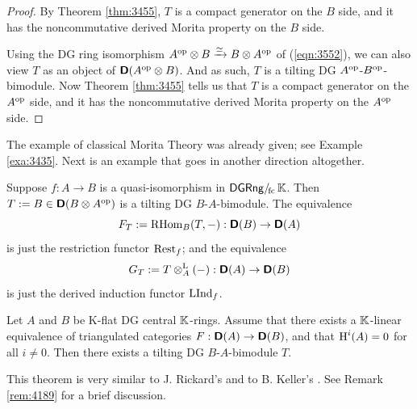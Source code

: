 \begin{proof}
By Theorem \ref{thm:3455}, $T$ is a compact generator on the $B$ side, 
and it has the noncommutative derived Morita property on the $B$ side. 

Using the DG ring isomorphism 
$A^{\mathrm{op}} \otimes B \xrightarrow{\simeq} B \otimes A^{\mathrm{op}}$
of (\ref{eqn:3552}), we can also view $T$ as an object of 
$\boldsymbol{\mathsf{D}}(A^{\mathrm{op}} \otimes B)$. And as such, $T$ is a tilting DG 
$A^{\mathrm{op}}$-$B^{\mathrm{op}}$-bimodule. Now Theorem \ref{thm:3455} tells us 
that $T$ is a compact generator on the $A^{\mathrm{op}}$ side, 
and it has the noncommutative derived Morita property on the 
$A^{\mathrm{op}}$ side. 
\end{proof}

The example of classical Morita Theory was already given; see Example 
\ref{exa:3435}. Next is an example that goes in another direction altogether.

\begin{exa} \label{eqn:3565}
Suppose $f : A \to B$ is a quasi-isomorphism in $\mathrm{\mathsf{DGRng}} /_{\! \mathrm{fc}}\, \mathbb{K}$.
Then 
$T := B \in \boldsymbol{\mathsf{D}}(B \otimes A^{\mathrm{op}})$
is a tilting DG $B$-$A$-bimodule. 
The equivalence 
\[ F_T := \operatorname{RHom}_B(T, -) : \boldsymbol{\mathsf{D}}(B) \to \boldsymbol{\mathsf{D}}(A) \]
is just the restriction functor $\operatorname{Rest}_f$; and the equivalence 
\[ G_T := T \otimes^{\mathrm{L}}_{A} (-) :
\boldsymbol{\mathsf{D}}(A) \to \boldsymbol{\mathsf{D}}(B) \]
is just the derived induction functor $\operatorname{LInd}_f$. 
\end{exa}

\begin{thm} \label{thm:3565} 
Let $A$ and $B$ be K-flat DG central $\mathbb{K}$-rings. Assume that there exists a 
$\mathbb{K}$-linear equivalence of triangulated categories 
$F : \lb \dcat{D}(A) \to \dcat{D}(B)$,
and that $\operatorname{H}^i(A) = 0$ for all $i \neq 0$. 
Then there exists a tilting DG $B$-$A$-bimodule $T$. 
\end{thm}

This theorem is very similar to J. Rickard's \cite[Theorem 6.4]{Ric2}
and to B. Keller's \cite[Corollary 9.2]{Kel1}. See Remark \ref{rem:4189} for a 
brief discussion.

